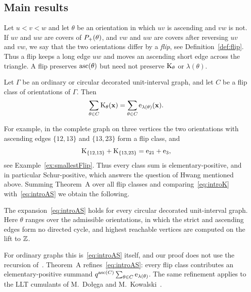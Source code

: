 \subsection*{Main results}

Let $u<v<w$ and let $\theta$ be an orientation in which $uv$ is ascending and
$vw$ is not.
If $uv$ and $uw$ are covers of $P_{+}(\theta)$, and $vw$ and $uw$ are covers
after reversing $uv$ and $vw$, we say that the two orientations differ by a
\emph{flip}, see Definition~\ref{def:flip}.
Thus a flip keeps a long edge $uw$ and moves an ascending short edge across the
triangle.
A flip preserves $\operatorname{asc}(\theta)$ but need not preserve $\mathrm{K}_{\theta}$ or
$\lambda(\theta)$.

\begin{theoremA}
Let $\Gamma$ be an ordinary or circular decorated unit-interval graph, and let
$C$ be a flip class of orientations of $\Gamma$.
Then
\[
 \sum_{\theta\in C}\mathrm{K}_{\theta}(\mathbf{x})=\sum_{\theta\in C}\mathrm{e}_{\lambda(\theta)}(\mathbf{x}).
\]
\end{theoremA}

For example, in the complete graph on three vertices the two orientations with
ascending edges $\{12,13\}$ and $\{13,23\}$ form a flip class, and
\[
 \mathrm{K}_{\{12,13\}}+\mathrm{K}_{\{13,23\}}=\mathrm{e}_{21}+\mathrm{e}_3,
\]
see Example~\ref{ex:smallestFlip}.
Thus every class sum is elementary-positive, and in particular Schur-positive,
which answers the question of Hwang mentioned above.
Summing Theorem~A over all flip classes and comparing~\eqref{eq:introK}
with~\eqref{eq:introAS} we obtain the following.

\begin{theoremB}
The expansion~\eqref{eq:introAS} holds for every circular decorated unit-interval
graph.
Here $\theta$ ranges over the admissible orientations, in which the strict and
ascending edges form no directed cycle, and highest reachable vertices are
computed on the lift to $\mathbb{Z}$.
\end{theoremB}

For ordinary graphs this is~\eqref{eq:introAS} itself, and our proof does not use
the recursion of~\cite{AlexanderssonSulzgruber2022}.
Theorem~A refines~\eqref{eq:introAS}: every flip class contributes an
elementary-positive summand $q^{\operatorname{asc}(C)}\sum_{\theta\in C}\mathrm{e}_{\lambda(\theta)}$.
The same refinement applies to the LLT cumulants of M.~Dołęga and
M.~Kowalski~\cite{DolegaKowalski2021x}.

